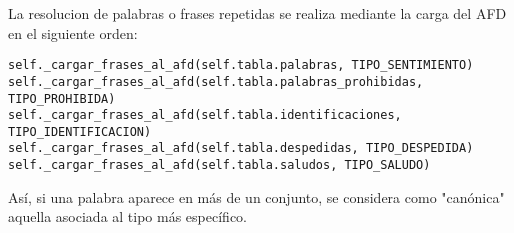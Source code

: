 La resolucion de palabras o frases repetidas se realiza
mediante la carga del AFD en el siguiente orden:

\begin{verbatim}
self._cargar_frases_al_afd(self.tabla.palabras, TIPO_SENTIMIENTO)
self._cargar_frases_al_afd(self.tabla.palabras_prohibidas, TIPO_PROHIBIDA)
self._cargar_frases_al_afd(self.tabla.identificaciones, TIPO_IDENTIFICACION)
self._cargar_frases_al_afd(self.tabla.despedidas, TIPO_DESPEDIDA)
self._cargar_frases_al_afd(self.tabla.saludos, TIPO_SALUDO)
\end{verbatim}

Así, si una palabra aparece en más de un conjunto, se considera como "canónica" aquella
asociada al tipo más específico.

